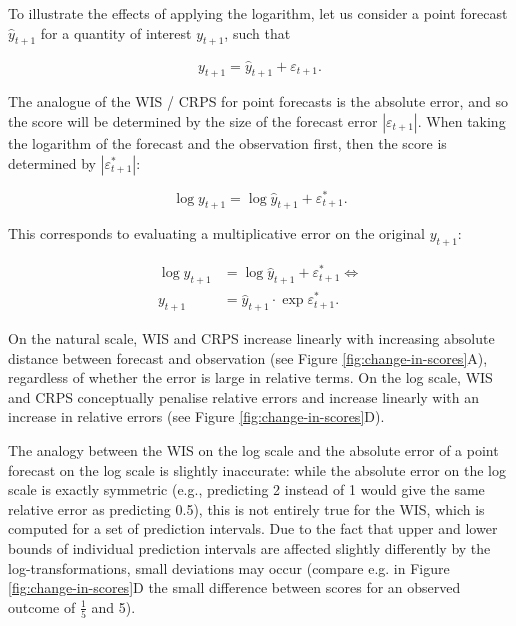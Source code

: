 \documentclass{article}
\begin{document}
To illustrate the effects of applying the logarithm, let us consider a point forecast $\hat{y}_{t+1}$ for a quantity of interest $y_{t+1}$, such that 
%
\begin{linenomath*}
\begin{equation*}
y_{t+1} = \hat{y}_{t+1} + \varepsilon_{t+1}.
\end{equation*}
\end{linenomath*}
%
The analogue of the WIS / CRPS for point forecasts is the absolute error, and so the score will be determined by the size of the forecast error $\left|\varepsilon_{t+1}\right|$. When taking the logarithm of the forecast and the observation first, then the score is determined by $\left|\varepsilon^*_{t+1}\right|$: 
\begin{linenomath*}
\begin{equation*}
\log y_{t+1} = \log \hat{y}_{t+1} + \varepsilon^*_{t+1}.
\end{equation*}
\end{linenomath*}
%
This corresponds to evaluating a multiplicative error on the original $y_{t+1}$:
%
\begin{linenomath*}
\begin{align*}
\log y_{t+1} &= \log \hat{y}_{t+1} + \varepsilon^*_{t+1} \Leftrightarrow \\    
y_{t+1} &= \hat{y}_{t+1} \cdot \exp{\varepsilon^*_{t+1}}.    
\end{align*}
\end{linenomath*}

On the natural scale, WIS and CRPS increase linearly with increasing absolute distance between forecast and observation (see Figure \ref{fig:change-in-scores}A), regardless of whether the error is large in relative terms. On the log scale, WIS and CRPS conceptually penalise relative errors and increase linearly with an increase in relative errors (see Figure \ref{fig:change-in-scores}D). 

The analogy between the WIS on the log scale and the absolute error of a point forecast on the log scale is slightly inaccurate: while the absolute error on the log scale is exactly symmetric (e.g., predicting 2 instead of 1 would give the same relative error as predicting 0.5), this is not entirely true for the WIS, which is computed for a set of prediction intervals. Due to the fact that upper and lower bounds of individual prediction intervals are affected slightly differently by the log-transformations, small deviations may occur (compare e.g. in Figure \ref{fig:change-in-scores}D the small difference between scores for an observed outcome of $\frac{1}{5}$ and 5). 
\end{document}
